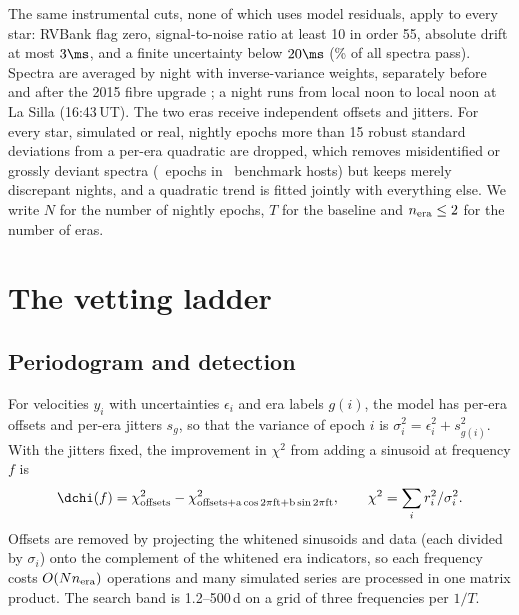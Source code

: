 The same instrumental cuts, none of which uses model residuals, apply to every
star: RVBank flag zero, signal-to-noise ratio at least 10 in order 55, absolute
drift at most $3\ms$, and a finite uncertainty below $20\ms$ (\nmRVBankKeptPct\% of
all spectra pass). Spectra are averaged by night with inverse-variance weights,
separately before and after the 2015 fibre upgrade \citep{LoCurto2015}; a night runs
from local noon to local noon at La Silla (16:43\,UT). The two eras receive
independent offsets and jitters. For every star, simulated or real, nightly epochs
more than 15 robust standard deviations from a per-era quadratic are dropped, which
removes misidentified or grossly deviant spectra (\nmBenchClipped\ epochs in
\nmBenchClippedStars\ benchmark hosts) but keeps merely discrepant nights, and a
quadratic trend is fitted jointly with everything else. We write $N$ for the number of
nightly epochs, $T$ for the baseline and $n_{\rm era} \le 2$ for the number of eras.

\section{The vetting ladder}
\label{sec:ladder}

\subsection{Periodogram and detection}
\label{sec:detect}

For velocities $y_i$ with uncertainties $\epsilon_i$ and era labels $g(i)$, the model
has per-era offsets and per-era jitters $s_g$, so that the variance of epoch $i$ is
$\sigma_i^2 = \epsilon_i^2 + s_{g(i)}^2$. With the jitters fixed, the improvement in
$\chi^2$ from adding a sinusoid at frequency $f$ is
\begin{equation}
\dchi(f) = \chi^2_{\rm offsets} - \chi^2_{\rm offsets + a\cos 2\pi ft + b \sin 2\pi ft},
\qquad \chi^2 = \sum_i r_i^2/\sigma_i^2 .
\end{equation}
Offsets are removed by projecting the whitened sinusoids and data (each divided by
$\sigma_i$) onto the complement of the whitened era indicators, so each frequency
costs $O(N n_{\rm era})$ operations and many simulated series are processed in one
matrix product. The search band is 1.2--500\,d on a grid of three frequencies per
$1/T$.

